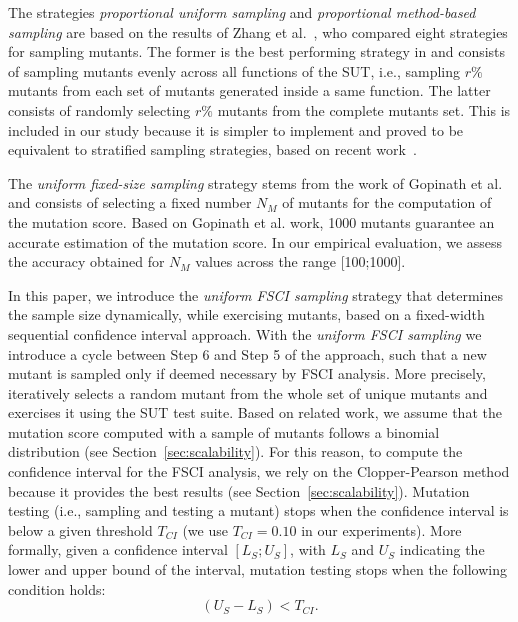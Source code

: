 The strategies \emph{proportional uniform sampling} and \emph{proportional method-based sampling} are based on the results of Zhang et al.~\cite{zhang2013operator}, who compared eight strategies for sampling mutants. 
The former is the best performing strategy in \cite{zhang2013operator} and consists of sampling mutants evenly across all functions of the SUT, i.e., sampling $r\%$ mutants from each set of mutants generated inside a same function.
 {The latter consists of randomly selecting $r\%$ mutants from the complete mutants set. This is included in our study because it is simpler to implement and proved to be equivalent to stratified sampling strategies, based on recent work~\cite{gopinath2015hard}.}

 {The \emph{uniform fixed-size sampling} strategy stems from the work of Gopinath et al.~\cite{gopinath2015hard} and consists of selecting a fixed number $N_M$ of mutants for the computation of the mutation score. Based on Gopinath et al. work, 1000 mutants guarantee an accurate estimation of the mutation score. In our empirical evaluation, we assess the accuracy obtained for $N_M$ values across the range [100;1000].}

 {In this paper, we introduce the \emph{uniform FSCI sampling} strategy that determines the sample size dynamically, while exercising mutants, based on a fixed-width sequential confidence interval approach.
With the \emph{uniform FSCI sampling} we introduce a cycle between Step 6 and Step 5 of the approach, such that a new mutant is sampled only if deemed necessary by FSCI analysis.
 More precisely, \APPR iteratively selects a random mutant from the whole set of unique mutants and exercises it using the SUT test suite. 
Based on related work, we assume that the mutation score computed with a sample of mutants follows a binomial distribution (see Section~\ref{sec:scalability}).
For this reason, to compute the confidence interval for the FSCI analysis, we rely on the Clopper-Pearson method because it provides the best results (see Section~\ref{sec:scalability}).
Mutation testing (i.e., sampling and testing a mutant) stops when the confidence interval is below a given threshold $T_{\mathit{CI}}$ (we use $T_{\mathit{CI}}=0.10$ in our experiments). More formally, given a confidence interval 
$[\mathit{L}_{S};\mathit{U}_{S}]$, with $\mathit{L}_{S}$ and $\mathit{U}_{S}$ indicating the lower and upper bound of the interval, mutation testing stops when the following condition holds:}
\begin{equation}
(\mathit{U}_{S}-\mathit{L}_{S})<T_{\mathit{CI}}.
\end{equation}

